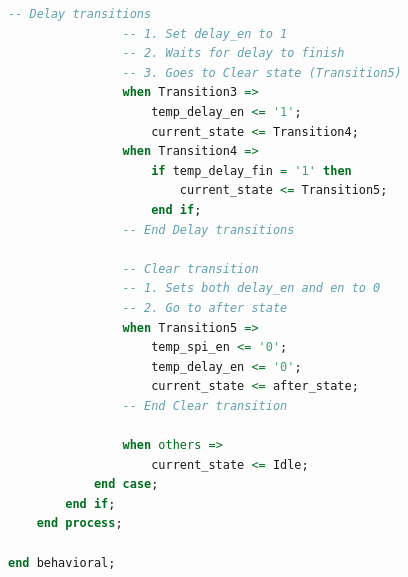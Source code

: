 \documentclass[a4paper,12pt]{article}
\begin{document}
\begin{lstlisting}[language=VHDL, caption={\texttt{oled\_ex.vhd}: demo de OLED adaptado para mostrar A, B y A+B en la primera línea.}]
                -- Delay transitions
                -- 1. Set delay_en to 1
                -- 2. Waits for delay to finish
                -- 3. Goes to Clear state (Transition5)
                when Transition3 =>
                    temp_delay_en <= '1';
                    current_state <= Transition4;
                when Transition4 =>
                    if temp_delay_fin = '1' then
                        current_state <= Transition5;
                    end if;
                -- End Delay transitions

                -- Clear transition
                -- 1. Sets both delay_en and en to 0
                -- 2. Go to after state
                when Transition5 =>
                    temp_spi_en <= '0';
                    temp_delay_en <= '0';
                    current_state <= after_state;
                -- End Clear transition

                when others =>
                    current_state <= Idle;
            end case;
        end if;
    end process;

end behavioral;
\end{lstlisting}
\end{document}
